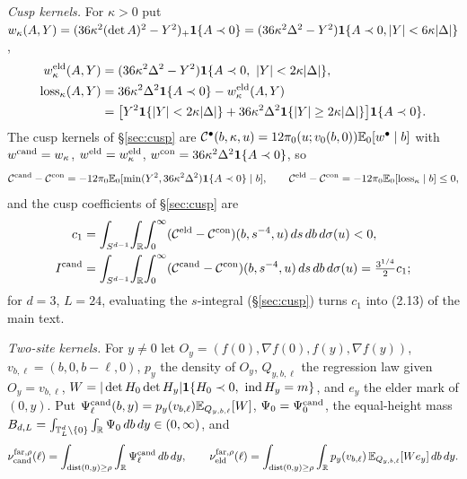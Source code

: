 \emph{Cusp kernels.} For $\kappa>0$ put $w_\kappa(A,Y)=(36\kappa^2(\det A)^2-Y^2)_+\mathbf 1\{A\prec0\}=(36\kappa^2\Delta^2-Y^2)\mathbf 1\{A\prec0,|Y|<6\kappa|\Delta|\}$,
\begin{equation}\label{eq:third-weights}
\begin{aligned}
w_\kappa^\eld(A,Y)&=(36\kappa^2\Delta^2-Y^2)\ind\{A\prec0,\ |Y|<2\kappa|\Delta|\},\\
\mathrm{loss}_\kappa(A,Y)&=36\kappa^2\Delta^2\ind\{A\prec0\}-w^\eld_\kappa(A,Y)\\
&=\bigl[Y^2\ind\{|Y|<2\kappa|\Delta|\}+36\kappa^2\Delta^2\ind\{|Y|\ge2\kappa|\Delta|\}\bigr]\ind\{A\prec0\}.
\end{aligned}
\end{equation}
The cusp kernels of \S\ref{sec:cusp} are $\mathcal C^\bullet(b,\kappa,u)=12\pi_0(u;v_0(b,0))\mathbb E_0[w^\bullet\mid b]$ with $w^{\mathrm{cand}}=w_\kappa$, $w^{\mathrm{eld}}=w^{\mathrm{eld}}_\kappa$, $w^{\rm con}=36\kappa^2\Delta^2\mathbf 1\{A\prec0\}$, so
\begin{equation}\label{eq:third-cuspdiff}
\mathcal C^{\mathrm{cand}}-\mathcal C^{\rm con}=-12\pi_0\mathbb E_0[\min(Y^2,36\kappa^2\Delta^2)\mathbf 1\{A\prec0\}\mid b],\qquad \mathcal C^{\mathrm{eld}}-\mathcal C^{\rm con}=-12\pi_0\mathbb E_0[\mathrm{loss}_\kappa\mid b]\le0,
\end{equation}
and the cusp coefficients of \S\ref{sec:cusp} are
\begin{equation}\label{eq:third-c1}
\begin{aligned}
c_1&=\int_{S^{d-1}}\!\int_\mathbb R\!\int_0^\infty(\mathcal C^{\mathrm{eld}}-\mathcal C^{\rm con})(b,s^{-4},u)\,ds\,db\,d\sigma(u)<0,\\
I^{\mathrm{cand}}&=\int_{S^{d-1}}\!\int_\mathbb R\!\int_0^\infty(\mathcal C^{\mathrm{cand}}-\mathcal C^{\rm con})(b,s^{-4},u)\,ds\,db\,d\sigma(u)=\tfrac{3^{1/4}}2c_1;
\end{aligned}
\end{equation}
for $d=3$, $L=24$, evaluating the $s$-integral (\S\ref{sec:cusp}) turns $c_1$ into (2.13) of the main text.

\emph{Two-site kernels.} For $y\ne0$ let $O_y=(f(0),\nabla f(0),f(y),\nabla f(y))$, $v_{b,\ell}=(b,0,b-\ell,0)$, $p_y$ the density of $O_y$, $Q_{y,b,\ell}$ the regression law given $O_y=v_{b,\ell}$, $W=|\det H_0\det H_y|\mathbf 1\{H_0\prec0,\ \operatorname{ind} H_y=m\}$, and $e_y$ the elder mark of $(0,y)$. Put $\Psi^{\mathrm{cand}}_\ell(b,y)=p_y(v_{b,\ell})\mathbb E_{Q_{y,b,\ell}}[W]$, $\Psi_0=\Psi^{\mathrm{cand}}_0$, the equal-height mass $B_{d,L}=\int_{\mathbb T^d_L\setminus\{0\}}\int_\mathbb R\Psi_0\,db\,dy\in(0,\infty)$, and
\begin{equation}\label{eq:third-far}
\nu_{\mathrm{cand}}^{{\rm far},\rho}(\ell)=\int_{\operatorname{dist}(0,y)\ge\rho}\int_\mathbb R\Psi^{\mathrm{cand}}_\ell\,db\,dy,\qquad
\nu_{\mathrm{eld}}^{{\rm far},\rho}(\ell)=\int_{\operatorname{dist}(0,y)\ge\rho}\int_\mathbb R p_y(v_{b,\ell})\,\mathbb E_{Q_{y,b,\ell}}[We_y]\,db\,dy.
\end{equation}


